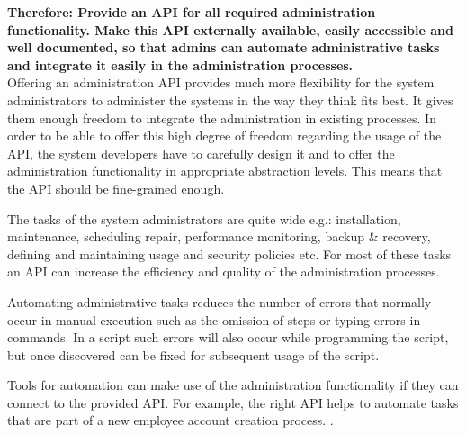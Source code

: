 \textbf{Therefore: Provide an API for all required administration functionality. Make this API externally available, easily accessible and well documented, so that admins can automate administrative tasks and integrate it easily in the administration processes.}\\




Offering an administration API provides much more flexibility for the system administrators to administer the systems in the way they think fits best. It gives them enough freedom to integrate the administration in existing processes. In order to be able to offer this high degree of freedom regarding the usage of the API, the system developers have to carefully design it and to offer the administration functionality in appropriate abstraction levels. This means that the API should be fine-grained enough.

The tasks of the system administrators are quite wide e.g.: installation, maintenance, scheduling repair, performance monitoring, backup \& recovery, defining and maintaining usage and security policies etc. For most of these tasks an API can increase the efficiency and quality of the administration processes. 

Automating administrative tasks reduces the number of errors that normally occur in manual execution such as the omission of steps or typing errors in commands. In a script such errors will also occur while programming the script, but once discovered can be fixed for subsequent usage of the script.

Tools for automation can make use of the administration functionality if they can connect to the provided API. For example, the right API helps to automate tasks that are part of a new employee account creation process. \cite{Limoncelli2011a}.

